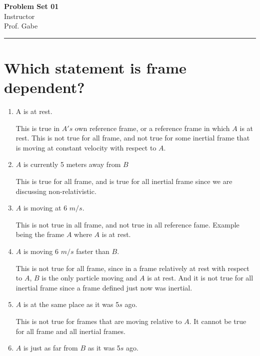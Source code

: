 \documentclass[12pt]{article}
\newif\ifshow
\begin{document}
\begin{center}
\ifshow
  \textbf{\Large Problem Set 01 Solution}\\
\else
  \textbf{\Large Problem Set 01}\\
\fi
Instructor \\ Prof. Gabe\\
\end{center}

\hrule

\vspace{0.2cm}

\section{Which statement is frame dependent?}

\begin{enumerate}
    \item A is at rest.

    This is true in $A's$ own reference frame, or a reference frame in which $A$ is at rest. This is not true for all frame, and not true for some inertial frame that is moving at constant velocity with respect to $A$.

    \item $A$ is currently 5 meters away from $B$

    This is true for all frame, and is true for all inertial frame since we are discussing non-relativistic. 

    \item $A$ is moving at 6 $m/s$.

    This is not true in all frame, and not true in all reference fame. Example being the frame $A$ where $A$ is at rest. 

    \item $A$ is moving 6 $m/s$ faster than $B$.

    This is not true for all frame, since in a frame relatively at rest with respect to $A$, $B$ is the only particle moving and $A$ is at rest. And it is not true for all inertial frame since a frame defined just now was inertial. 

    \item $A$ is at the same place as it was 5$s$ ago. 

    This is not true for frames that are moving relative to $A$. It cannot be true for all frame and all inertial frames. 

    \item $A$ is just as far from $B$ as it was 5$s$ ago.


\end{enumerate}
\end{document}
